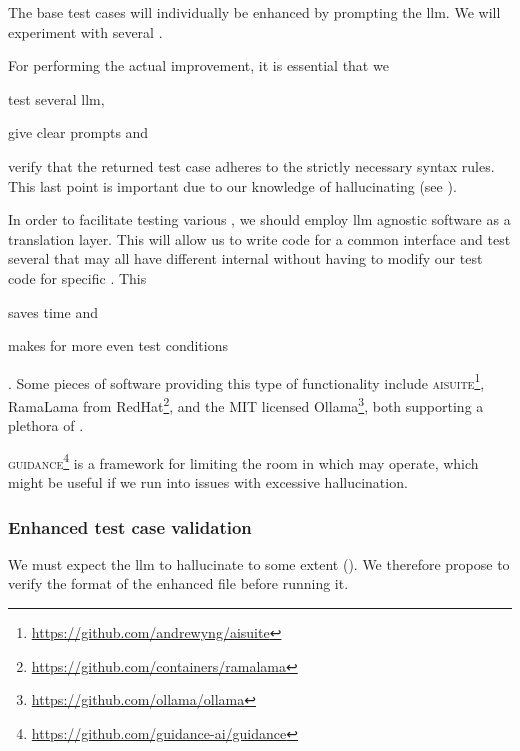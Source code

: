 The base test cases will individually be enhanced by prompting the
\acrshort{llm}. We will experiment with several .

For performing the actual improvement, it is essential that we \begin{inparaenum}
    \item test several \acrshort{llm},
    \item give clear prompts
    and
    \item verify that the returned test case adheres to the strictly necessary
    syntax rules. This last point is important due to our knowledge of
     hallucinating (see ).
\end{inparaenum}

In order to facilitate testing various , we should employ
\acrshort{llm} agnostic software as a translation layer. This will allow us to
write code for a common interface and test several  that may all
have different internal  without having to modify our test code
for specific . This \begin{inparaenum}
    \item saves time
    and
    \item makes for more even test conditions \end{inparaenum}. Some pieces of software providing
this type of functionality include
\textsc{aisuite}\footnote{\url{https://github.com/andrewyng/aisuite}}, RamaLama from
RedHat\footnote{\url{https://github.com/containers/ramalama}}, and the MIT licensed
Ollama\footnote{\url{https://github.com/ollama/ollama}}, both supporting a plethora of
.

\textsc{guidance}\footnote{\url{https://github.com/guidance-ai/guidance}} is a
framework for limiting the room in which  may operate, which
might be useful if we run into issues with excessive hallucination.


\subsubsection{Enhanced test case validation}

We must expect the \acrshort{llm} to hallucinate to some extent (). We
therefore propose to verify the format of the enhanced file before running it.

